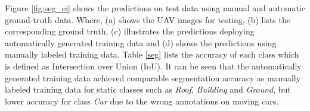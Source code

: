 
Figure \ref{fig:seg_ei} shows the predictions on test data using manual and automatic ground-truth data. Where, (a) shows the UAV images for testing, (b) lists the corresponding ground truth, (c) illustrates the predictions deploying automatically generated training data and (d) shows the predictions using manually labeled training data. Table \ref{seg} lists the accuracy of each class which is defined as Intersection over Union (IoU). It can be seen that the automatically generated training data achieved comparable segmentation accuracy as manually labeled training data for static classes such as \textit{Roof}, \textit{Building} and \textit{Ground}, but lower accuracy for class \textit{Car} due to the wrong annotations on moving cars.


